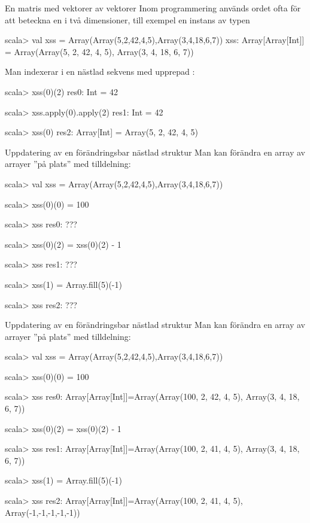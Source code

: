 \begin{Slide}{En matris med vektorer av vektorer}
Inom programmering används ordet  ofta för att beteckna en  i två dimensioner, till exempel en instans av typen 
\begin{REPL}
scala> val xss = Array(Array(5,2,42,4,5),Array(3,4,18,6,7))
xss: Array[Array[Int]] = Array(Array(5, 2, 42, 4, 5), Array(3, 4, 18, 6, 7))
\end{REPL}

Man indexerar i en nästlad sekvens med upprepad :
\begin{REPL}
scala> xss(0)(2)
res0: Int = 42

scala> xss.apply(0).apply(2)
res1: Int = 42

scala> xss(0)
res2: Array[Int] = Array(5, 2, 42, 4, 5)
\end{REPL}
\end{Slide}

\begin{Slide}{Uppdatering av en förändringsbar nästlad struktur}
Man kan förändra en array av arrayer ''på plats'' med tilldelning:
\begin{REPL}
scala> val xss = Array(Array(5,2,42,4,5),Array(3,4,18,6,7))

scala> xss(0)(0) = 100

scala> xss
res0: ???

scala> xss(0)(2) = xss(0)(2) - 1

scala> xss
res1: ???

scala> xss(1) = Array.fill(5)(-1)

scala> xss
res2: ???
\end{REPL}
\end{Slide}

\begin{Slide}{Uppdatering av en förändringsbar nästlad struktur}
Man kan förändra en array av arrayer ''på plats'' med tilldelning:
\begin{REPL}
scala> val xss = Array(Array(5,2,42,4,5),Array(3,4,18,6,7))

scala> xss(0)(0) = 100

scala> xss
res0: Array[Array[Int]]=Array(Array(100, 2, 42, 4, 5), Array(3, 4, 18, 6, 7))

scala> xss(0)(2) = xss(0)(2) - 1

scala> xss
res1: Array[Array[Int]]=Array(Array(100, 2, 41, 4, 5), Array(3, 4, 18, 6, 7))

scala> xss(1) = Array.fill(5)(-1)

scala> xss
res2: Array[Array[Int]]=Array(Array(100, 2, 41, 4, 5), Array(-1,-1,-1,-1,-1))
\end{REPL}
\end{Slide}


